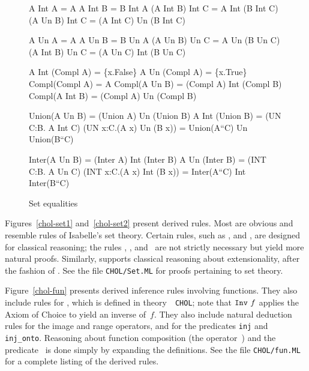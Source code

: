 \begin{figure} \underscoreon   \hfuzz=4pt%
\begin{ttbox}
        A Int A = A
       A Int B = B Int A
         (A Int B) Int C  =  A Int (B Int C)
    (A Un B)  Int C  =  (A Int C) Un (B Int C)

         A Un A = A
        A Un B = B Un A
          (A Un B)  Un C  =  A Un (B Un C)
    (A Int B) Un C  =  (A Un C) Int (B Un C)

    A Int (Compl A) = \{x.False\}
   A Un  (Compl A) = \{x.True\}
 Compl(Compl A) = A
          Compl(A Un B)  = (Compl A) Int (Compl B)
         Compl(A Int B) = (Compl A) Un (Compl B)

  Union(A Un B) = (Union A) Un (Union B)
         A Int (Union B) = (UN C:B. A Int C)
    (UN x:C.(A x) Un (B x)) = Union(A``C) Un Union(B``C)

  Inter(A Un B) = (Inter A) Int (Inter B)
          A Un (Inter B) = (INT C:B. A Un C)
   (INT x:C.(A x) Int (B x)) = Inter(A``C) Int Inter(B``C)
\end{ttbox}
\caption{Set equalities} \label{chol-equalities}
\end{figure}


Figures~\ref{chol-set1} and~\ref{chol-set2} present derived rules.  Most are
obvious and resemble rules of Isabelle's {\ZF} set theory.  Certain rules,
such as ,  and ,
are designed for classical reasoning; the rules ,
,  and~ are not
strictly necessary but yield more natural proofs.  Similarly,
 supports classical reasoning about extensionality,
after the fashion of .  See the file {\tt CHOL/Set.ML} for
proofs pertaining to set theory.

Figure~\ref{chol-fun} presents derived inference rules involving functions.
They also include rules for , which is defined in theory~{\tt
  CHOL}; note that ${\tt Inv}~f$ applies the Axiom of Choice to yield an
inverse of~$f$.  They also include natural deduction rules for the image
and range operators, and for the predicates {\tt inj} and {\tt inj_onto}.
Reasoning about function composition (the operator~) and the
predicate~ is done simply by expanding the definitions.  See
the file {\tt CHOL/fun.ML} for a complete listing of the derived rules.

